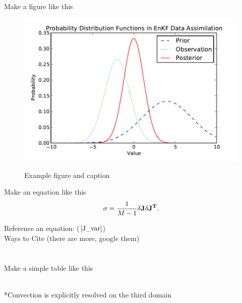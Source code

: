\documentclass{ttuthes2015}
\newcommand{\tab}{\hspace*{2em}}  %
\begin{document}
\tab Make a figure like this
\begin{figure}[!htb]
  \centering
  \noindent\includegraphics[width=30pc,angle=0]{./example.pdf}\\
  \caption{Example figure and caption}
\label{example2}
\end{figure}

\tab Make an equation like this
\begin{align}\label{J_var}
	\sigma = \frac{1}{M-1} \delta\bf{J} \delta{\mathbf{J}}^T.
\end{align}

\tab Reference an equation: ($\ref{J_var}$) \\
\tab Ways to Cite (there are more, google them) \\
\citep{Ancell2013} \\
\cite{Ancell2013} \\

\tab Make a simple table like this
\begin{table}[!h]   %
\caption{Model Parameterizations Used} 
\centering %
 \\
*Convection is explicitly resolved on the third domain
\label{params} %
\end{table} 
\end{document}
